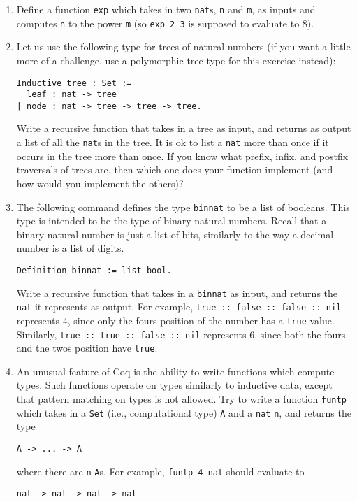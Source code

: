\documentclass{book}[12pt]
\begin{document}
\begin{enumerate}
\item Define a function \texttt{exp} which takes in two \texttt{nat}s,
\texttt{n} and \texttt{m}, as inputs and computes \texttt{n} to the power
\texttt{m} (so \texttt{exp 2 3} is supposed to evaluate to 8).

\item Let us use the following type for trees of natural numbers (if
you want a little more of a challenge, use a polymorphic tree type for
this exercise instead):

\begin{verbatim}
Inductive tree : Set :=
  leaf : nat -> tree
| node : nat -> tree -> tree -> tree.
\end{verbatim}

\noindent Write a recursive function that takes in a tree as input,
and returns as output a list of all the \texttt{nat}s in the tree.  It
is ok to list a \texttt{nat} more than once if it occurs in the tree
more than once.  If you know what prefix, infix, and postfix
traversals of trees are, then which one does your function implement
(and how would you implement the others)?

\item The following command defines the type \texttt{binnat} to be a
list of booleans.  This type is intended to be the type of binary
natural numbers.  Recall that a binary natural number is just a list
of bits, similarly to the way a decimal number is a list of digits.

\begin{verbatim}
Definition binnat := list bool.
\end{verbatim}

\noindent Write a recursive function that takes in a \texttt{binnat}
as input, and returns the \texttt{nat} it represents as output.  For
example, \texttt{true :: false :: false :: nil} represents 4, since
only the fours position of the number has a \texttt{true} value.
Similarly, \texttt{true :: true :: false :: nil} represents 6, since
both the fours and the twos position have \texttt{true}.

\item An unusual feature of Coq is the ability to write functions
which compute types.  Such functions operate on types similarly to
inductive data, except that pattern matching on types is not allowed.
Try to write a function \texttt{funtp} which takes in a \texttt{Set}
(i.e., computational type) \texttt{A} and a \texttt{nat} \texttt{n},
and returns the type

\begin{verbatim}
A -> ... -> A
\end{verbatim}

\noindent where there are \texttt{n} \texttt{A}s.  For example,
\texttt{funtp 4 nat} should evaluate to

\begin{verbatim}
nat -> nat -> nat -> nat
\end{verbatim}

\end{enumerate}
\end{document}
